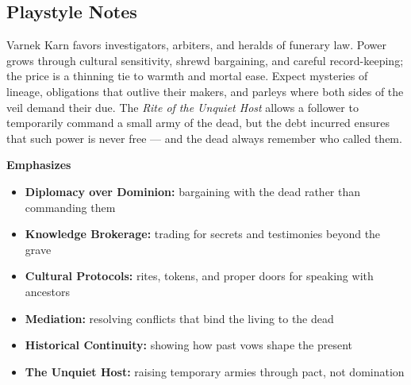 \subsection*{Playstyle Notes}
Varnek Karn favors investigators, arbiters, and heralds of funerary law. Power grows through cultural sensitivity, shrewd bargaining, and careful record-keeping; the price is a thinning tie to warmth and mortal ease. Expect mysteries of lineage, obligations that outlive their makers, and parleys where both sides of the veil demand their due. The \textit{Rite of the Unquiet Host} allows a follower to temporarily command a small army of the dead, but the debt incurred ensures that such power is never free --- and the dead always remember who called them.

\noindent\textbf{Emphasizes}
\begin{itemize}
  \item \textbf{Diplomacy over Dominion:} bargaining with the dead rather than commanding them
  \item \textbf{Knowledge Brokerage:} trading for secrets and testimonies beyond the grave
  \item \textbf{Cultural Protocols:} rites, tokens, and proper doors for speaking with ancestors
  \item \textbf{Mediation:} resolving conflicts that bind the living to the dead
  \item \textbf{Historical Continuity:} showing how past vows shape the present
  \item \textbf{The Unquiet Host:} raising temporary armies through pact, not domination
\end{itemize}

